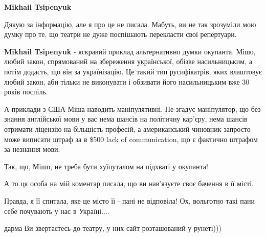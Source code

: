 \begin{itemize}
\begin{itemize}
\begin{itemize}
\textbf{Mikhail Tsipenyuk} 

Дякую за інформацію, але я про це не писала. Мабуть, ви не так зрозуміли мою
думку про те, що театри не дуже поспішають перекласти свої репертуари.
\end{itemize}

 

\textbf{Mikhail Tsipenyuk} - яскравий приклад альтернативно думки окупанта.
Мішо, любий закон, спрямований на збереження української, обізве насильницьким,
а потім додасть, що він за українізацію. Це такий тип русифікатрів, яких
влаштовує любий закон, аби тільки не виконувати і обзивати його насильницьким
вже 30 років поспіль. 

А приклади з США Міша наводить маніпулятивні. Не згадує маніпулятор, що без
знання англійської мови у вас нема шансів на політичну кар'єру, нема шансів
отримати ліцензію на більшість професій, а американський чиновник запросто може
виписати штраф за в \$500 lack of communication, що є фактично штрафом за
незнання мови. 

Так, що, Мішо, не треба бути хуїпуталом на підхваті у окупанта!

\end{itemize}

 

А то ця особа на мій коментар писала, що ви нав'язуєте своє бачення в її місті.

Правда, я її спитала, яке це місто її - пані не відповіла! Ох, вольготно такі
пани себе почувають у нас в Україні....


 
дарма Ви звертаєтесь до театру, у них сайт розташований у рунеті)))

 


\end{itemize}
